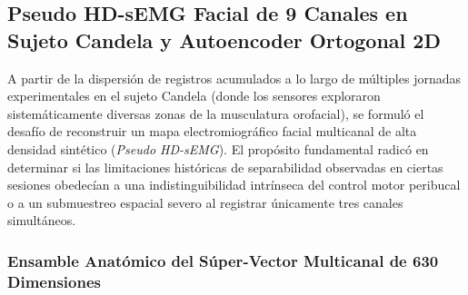 \documentclass[11pt,a4paper]{article}
\begin{document}
\subsection{Pseudo HD-sEMG Facial de 9 Canales en Sujeto Candela y Autoencoder Ortogonal 2D}
\label{subsec:pseudo_hd_emg_candela_autoencoder}

A partir de la dispersión de registros acumulados a lo largo de múltiples jornadas experimentales en el sujeto Candela (donde los sensores exploraron sistemáticamente diversas zonas de la musculatura orofacial), se formuló el desafío de reconstruir un mapa electromiográfico facial multicanal de alta densidad sintético (\textit{Pseudo HD-sEMG}). El propósito fundamental radicó en determinar si las limitaciones históricas de separabilidad observadas en ciertas sesiones obedecían a una indistinguibilidad intrínseca del control motor peribucal o a un submuestreo espacial severo al registrar únicamente tres canales simultáneos.

\subsubsection{Ensamble Anatómico del Súper-Vector Multicanal de 630 Dimensiones}
\label{subsubsec:ensamble_anatomico_pseudo_hd}
\end{document}
